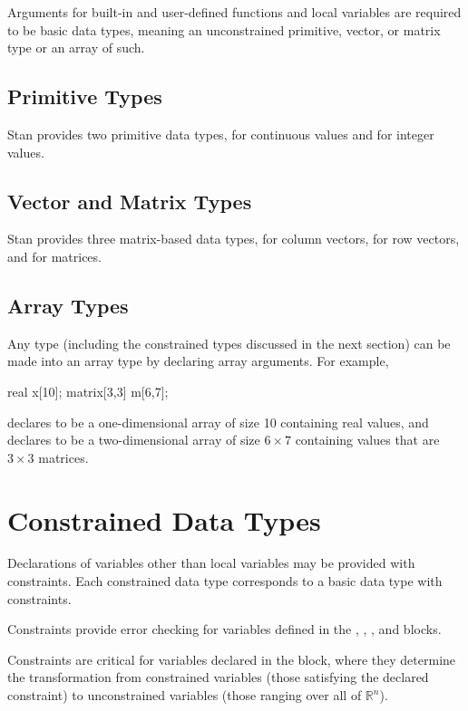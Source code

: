 Arguments for built-in and user-defined functions and local variables
are required to be basic data types, meaning an unconstrained
primitive, vector, or matrix type or an array of such.

\subsection{Primitive Types}

Stan provides two primitive data types,  for continuous
values and  for integer values.

\subsection{Vector and Matrix Types}
Stan provides three matrix-based data types,  for column
vectors,  for row vectors, and  for
matrices.

\subsection{Array Types}

Any type (including the constrained types discussed in the next
section) can be made into an array type by declaring array arguments.
For example,
%
\begin{stancode}
real x[10];
matrix[3,3] m[6,7];
\end{stancode}
%
declares  to be a one-dimensional array of size 10 containing
real values, and declares  to be a two-dimensional array of
size $6 \times 7$ containing values that are $3 \times 3$ matrices.


\section{Constrained Data Types}

Declarations of variables other than local variables may be provided
with constraints.  Each constrained data type corresponds to a basic
data type with constraints.

Constraints provide error checking for variables defined in the ,
, , and 
 blocks.

Constraints are critical for variables declared in the
 block, where they determine the transformation from
constrained variables (those satisfying the declared constraint) to
unconstrained variables (those ranging over all of $\mathbb{R}^n$).

